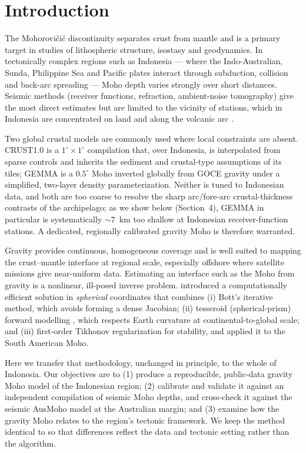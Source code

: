 \documentclass[extra,mreferee]{gji}
\begin{document}
\section{Introduction}
The Mohorovi\v{c}i\'{c} discontinuity separates crust from mantle and is a primary
target in studies of lithospheric structure, isostasy and geodynamics. In
tectonically complex regions such as Indonesia --- where the Indo-Australian,
Sunda, Philippine Sea and Pacific plates interact through subduction, collision
and back-arc spreading --- Moho depth varies strongly over short distances.
Seismic methods (receiver functions, refraction, ambient-noise tomography) give
the most direct estimates but are limited to the vicinity of stations, which in
Indonesia are concentrated on land and along the volcanic arc
\citep{zhang2023}.

Two global crustal models are commonly used where local constraints are absent.
{CRUST1.0} \citep{laske2013} is a $1^{\circ}\times1^{\circ}$ compilation that, over
Indonesia, is interpolated from sparse controls and inherits the sediment and
crustal-type assumptions of its tiles; {GEMMA} \citep{reguzzoni2015} is a
$0.5^{\circ}$ Moho inverted globally from {GOCE} gravity under a simplified,
two-layer density parameterization. Neither is tuned to Indonesian data, and both
are too coarse to resolve the sharp arc/fore-arc crustal-thickness contrasts of the
archipelago; as we show below (Section~4), {GEMMA} in particular is systematically
$\sim7$~km too shallow at Indonesian receiver-function stations. A dedicated,
regionally calibrated gravity Moho is therefore warranted.

Gravity provides continuous, homogeneous coverage and is well suited to mapping
the crust--mantle interface at regional scale, especially offshore where satellite
missions give near-uniform data. Estimating an interface such as the Moho from
gravity is a nonlinear, ill-posed inverse problem. \citet{uieda2017} introduced a
computationally efficient solution in \emph{spherical} coordinates that combines
(i) Bott's \citep{bott1960} iterative method, which avoids forming a dense
Jacobian; (ii) tesseroid (spherical-prism) forward modelling \citep{uieda2016},
which respects Earth curvature at continental-to-global scale; and (iii)
first-order Tikhonov regularization for stability, and applied it to the South
American Moho.

Here we transfer that methodology, unchanged in principle, to the whole of
Indonesia. Our objectives are to (1) produce a reproducible, public-data gravity
Moho model of the Indonesian region; (2) calibrate and validate it against an
independent compilation of seismic Moho depths, and cross-check it against the
seismic {AusMoho} model \citep{kennett2011} at the Australian margin; and (3)
examine how the gravity Moho relates to the region's tectonic framework. We keep
the method identical to \citet{uieda2017} so that differences reflect the data and
tectonic setting rather than the algorithm.
\end{document}
